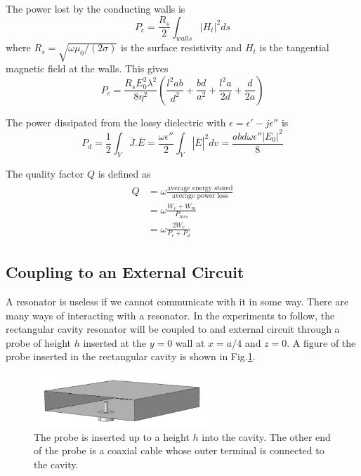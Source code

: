 The power lost by the conducting walls is
\begin{equation}
P_c=\frac{R_s}{2}\int_{walls} |H_t|^2ds
\end{equation}
where $R_s=\sqrt{\omega\mu_0/(2\sigma)}$ is the surface resistivity and $H_t$ is the tangential magnetic field at the walls. This gives
\begin{equation}
P_c=\frac{R_sE_0^2\lambda^2}{8\eta^2}\left(\frac{l^2ab}{d^2}+\frac{bd}{a^2}+\frac{l^2a}{2d}+\frac{d}{2a}\right)
\end{equation}

The power dissipated from the lossy dielectric with $\epsilon = \epsilon'-j\epsilon''$ is
\begin{equation}
P_d = \frac{1}{2}\int_V\bar{J}.\bar{E}=\frac{\omega\epsilon''}{2}\int_V|\bar{E}|^2dv=\frac{abd\omega\epsilon''|E_0|^2}{8}
\end{equation}

The quality factor $Q$ is defined as
\begin{align}
\begin{split}
Q&=\omega\frac{\text{average energy stored}}{\text{average power loss}}\\
&=\omega\frac{W_e+W_m}{P_{loss}}\\
&=\omega\frac{2W_e}{P_c+P_d}
\end{split}
\end{align}

\subsection{Coupling to an External Circuit}

A resonator is useless if we cannot communicate with it in some way. There are many ways of interacting with a resonator. In the experiments to follow, the rectangular cavity resonator will be coupled to and external circuit through a probe of height $h$ inserted at the $y=0$ wall at $x=a/4$ and $z=0$. A figure of the probe inserted in the rectangular cavity is shown in Fig.\ref{fig:Probe}.

\begin{figure}
\centering
\includegraphics[width=250px]{Figures/probe}
\decoRule
\caption[Probe in resonator]{The probe is inserted up to a height $h$ into the cavity. The other end of the probe is a coaxial cable whose outer terminal is connected to the cavity.}
\label{fig:Probe}
\end{figure}

